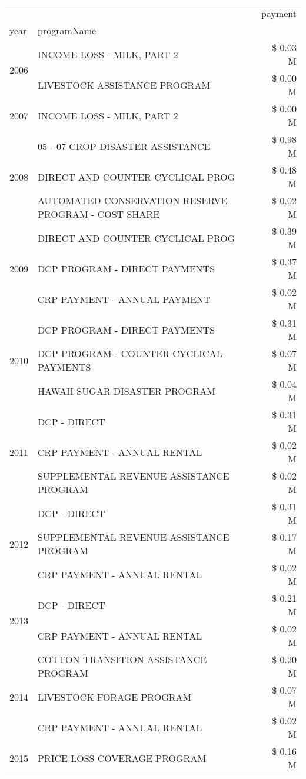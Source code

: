 \begin{tabular}{llr}
\toprule
 &  & payment \\
year & programName &  \\
\midrule
\multirow[t]{2}{*}{2006} & INCOME LOSS - MILK, PART 2 & \$ 0.03 M \\
 & LIVESTOCK ASSISTANCE PROGRAM & \$ 0.00 M \\
\cline{1-3}
2007 & INCOME LOSS - MILK, PART 2 & \$ 0.00 M \\
\cline{1-3}
\multirow[t]{3}{*}{2008} & 05 - 07 CROP DISASTER ASSISTANCE & \$ 0.98 M \\
 & DIRECT AND COUNTER CYCLICAL PROG & \$ 0.48 M \\
 & AUTOMATED CONSERVATION RESERVE PROGRAM - COST SHARE & \$ 0.02 M \\
\cline{1-3}
\multirow[t]{3}{*}{2009} & DIRECT AND COUNTER CYCLICAL PROG & \$ 0.39 M \\
 & DCP PROGRAM - DIRECT PAYMENTS & \$ 0.37 M \\
 & CRP PAYMENT - ANNUAL PAYMENT & \$ 0.02 M \\
\cline{1-3}
\multirow[t]{3}{*}{2010} & DCP PROGRAM - DIRECT PAYMENTS & \$ 0.31 M \\
 & DCP PROGRAM - COUNTER CYCLICAL PAYMENTS & \$ 0.07 M \\
 & HAWAII SUGAR DISASTER PROGRAM & \$ 0.04 M \\
\cline{1-3}
\multirow[t]{3}{*}{2011} & DCP - DIRECT & \$ 0.31 M \\
 & CRP PAYMENT - ANNUAL RENTAL & \$ 0.02 M \\
 & SUPPLEMENTAL REVENUE ASSISTANCE PROGRAM & \$ 0.02 M \\
\cline{1-3}
\multirow[t]{3}{*}{2012} & DCP - DIRECT & \$ 0.31 M \\
 & SUPPLEMENTAL REVENUE ASSISTANCE PROGRAM & \$ 0.17 M \\
 & CRP PAYMENT - ANNUAL RENTAL & \$ 0.02 M \\
\cline{1-3}
\multirow[t]{2}{*}{2013} & DCP - DIRECT & \$ 0.21 M \\
 & CRP PAYMENT - ANNUAL RENTAL & \$ 0.02 M \\
\cline{1-3}
\multirow[t]{3}{*}{2014} & COTTON TRANSITION ASSISTANCE PROGRAM & \$ 0.20 M \\
 & LIVESTOCK FORAGE PROGRAM & \$ 0.07 M \\
 & CRP PAYMENT - ANNUAL RENTAL & \$ 0.02 M \\
\cline{1-3}
\multirow[t]{3}{*}{2015} & PRICE LOSS COVERAGE PROGRAM & \$ 0.16 M \\

\end{tabular}
